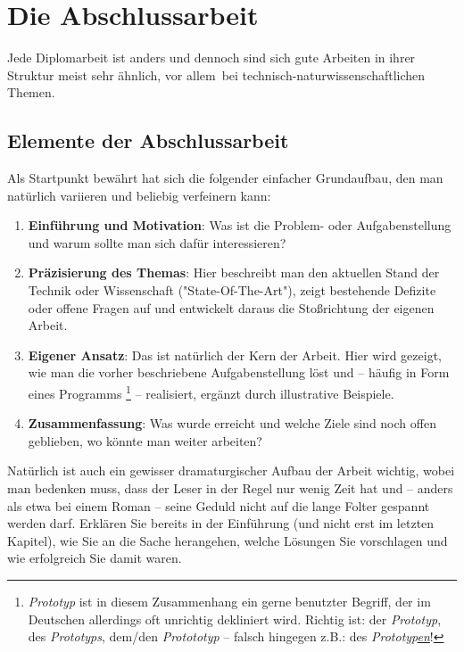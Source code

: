 \chapter{Die Abschlussarbeit}
\label{cha:Diplomschrift}

Jede Diplomarbeit ist anders und dennoch sind sich gute
Arbeiten in ihrer Struktur meist sehr ähnlich, vor allem\ bei
technisch-natur\-wissen\-schaft\-lichen Themen. 

\section{Elemente der Abschlussarbeit}

Als Startpunkt bewährt hat sich die folgender
einfacher Grundaufbau, den man natürlich vari\-ieren und beliebig
verfeinern kann:
%
\begin{enumerate}
\item \textbf{Einführung und Motivation}: Was ist die Problem- oder Aufgabenstellung und
warum sollte man sich dafür interessieren?
\item \textbf{Präzisierung des Themas}: Hier beschreibt man den aktuellen Stand der Technik
oder Wissenschaft ("State-Of-The-Art"), zeigt bestehende
Defizite oder offene Fragen auf und entwickelt daraus die
Stoßrichtung der eigenen Arbeit.
\item \textbf{Eigener Ansatz}: Das ist natürlich der Kern der Arbeit. Hier
wird gezeigt, wie man die vorher beschriebene Aufgabenstellung löst und --
häufig in Form eines Programms%
\footnote{\emph{Prototyp} ist in diesem Zusammenhang ein gerne benutzter Begriff, der im Deutschen
allerdings oft unrichtig dekliniert wird. Richtig ist: der \emph{Prototyp}, des \emph{Prototyps}, dem/den \emph{Protototyp} -- falsch hingegen z.B.: des \emph{Prototyp\underline{en}}!
} --
realisiert, ergänzt durch illustrative Beispiele.
\item \textbf{Zusammenfassung}: Was wurde erreicht und welche Ziele sind
noch offen geblieben, wo könnte man weiter arbeiten?
\end{enumerate}
%
Natürlich ist auch ein gewisser dramaturgischer Aufbau der Arbeit
wichtig, wobei man bedenken muss, dass der Leser in der Regel nur
wenig Zeit hat und -- anders als etwa bei einem Roman -- seine
Geduld nicht auf die lange Folter gespannt werden darf. Erklären
Sie bereits in der Einführung (und nicht erst im letzten Kapitel),
wie Sie an die Sache herangehen, welche Lösungen Sie vorschlagen
und wie erfolgreich Sie damit waren.

